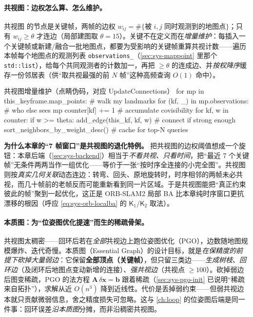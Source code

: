 \paragraph{共视图：边权怎么算、怎么维护。}
共视图\cite{murartal2015orbslam} 的节点是关键帧，两帧的边权 $w_{ij}=\#\{$被 $i,j$ 同时观测到的地图点$\}$；只有 $w_{ij}\ge\theta$ 才连边（局部建图取 $\theta=15$）。关键不在定义而在\emph{增量维护}：每插入一个关键帧或新建/融合一批地图点，都要为受影响的关键帧重算共视计数——遍历本帧每个地图点的观测列表 \texttt{observations\_}（\cref{sec:sys-mappoint} 里那个 \texttt{std::list}），给每个共同观测者的计数加一，再把 $\ge\theta$ 的连成边、并\emph{按权降序}缓存一份邻居表（供“取共视最强的前 $N$ 帧”这种高频查询 $O(1)$ 命中）。
\begin{codebox}[text]{共视图增量维护（点睛伪码，对应 UpdateConnections）}
for mp in this_keyframe.map_points:          # walk my landmarks
    for (kf, _) in mp.observations:          # who else sees mp
        counter[kf] += 1                     # accumulate covisibility
for kf, w in counter:
    if w >= theta: add_edge(this_kf, kf, w)  # connect if strong enough
sort_neighbors_by_weight_desc()              # cache for top-N queries
\end{codebox}

\begin{insight}
\textbf{为什么本章的“7 帧窗口”是共视图的退化特例。}
把共视图的边权阈值想成一个旋钮：本章后端（\cref{sec:sys-backend}）相当于\emph{不看共视、只看时间}，把“最近 7 个关键帧”无条件两两当作一组优化——等价于一张“按时序全连接的小完全图”。共视图则按\emph{真实几何关联}动态连边：转弯、回头、原地旋转时，时序相邻的两帧未必共视，而几十帧前的老帧反而可能重新看到同一片区域。于是共视图能把“真正约束彼此的帧”聚到一起优化，这正是 ORB-SLAM2 局部 BA 比本章纯时序窗口更抗漂移的根因（呼应 \cref{eq:sys-orb-localba} 的 $\mathsf{K}_1/\mathsf{K}_2$ 取法）。
\end{insight}

\paragraph{本质图：为“位姿图优化提速”而生的稀疏骨架。}
共视图太稠密——回环后若在\emph{全部}共视边上跑位姿图优化（PGO），边数随地图规模爆炸、迭代奇慢。本质图（Essential Graph）的设计目标，就是\emph{在保精度的前提下砍掉大量弱边}：它保留\textbf{全部顶点（关键帧）}，但只留三类边——\emph{生成树枝}、\emph{回环边}（及闭环后地图点变动新增的连接）、\emph{强共视边}（共视点 $\ge 100$）。砍掉弱边后图变稀疏，PGO 的法方程 $\mathbf{A}\,\delta\mathbf{x}=\mathbf{b}$ 跟着稀疏（\cref{sec:sys-pgo-init} 已说明“稀疏来自拓扑”），求解从近 $O(n^3)$ 降到近线性。代价是丢掉弱约束——但弱共视边本就只贡献微弱信息，舍之精度损失可忽略。这与 \cref{ch:loop} 的位姿图后端是同一件事：回环误差\emph{沿本质图}分摊，而非沿稠密共视图。

